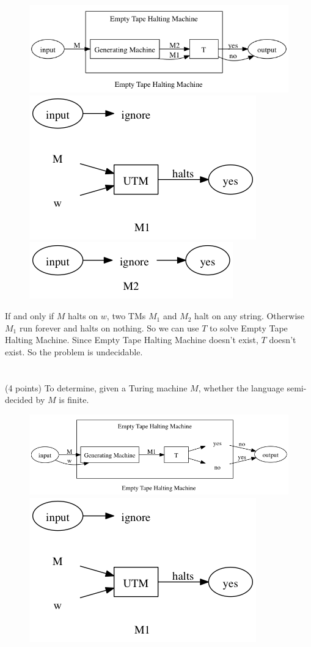 \documentclass[paper=a4, fontsize=11pt]{scrartcl} %
\begin{document}
\begin{figure}[H]
  \centering
  \includegraphics[width=\textwidth]{9-8.gv.png}
  \includegraphics[width=.4\textwidth]{9-8.gv.2.png}
  \includegraphics[width=.4\textwidth]{9-8.gv.3.png}
\end{figure}

If and only if $M$ halts on $w$, two TMs $M_1$ and $M_2$ halt on any
string. Otherwise $M_1$ run forever and halts on nothing. So we can
use $T$ to solve Empty Tape Halting Machine. Since Empty Tape Halting
Machine doesn't exist, $T$ doesn't exist. So the problem is undecidable.


\section{}
\begin{fancyquotes}
  (4 points) To determine, given a Turing machine $M$, whether the
  language semi-decided by $M$ is finite.
\end{fancyquotes}

\begin{figure}[H]
  \centering
  \includegraphics[width=\textwidth]{9-9.gv.png}
  \includegraphics[width=.4\textwidth]{9-9.gv.2.png}
\end{figure}
\end{document}
